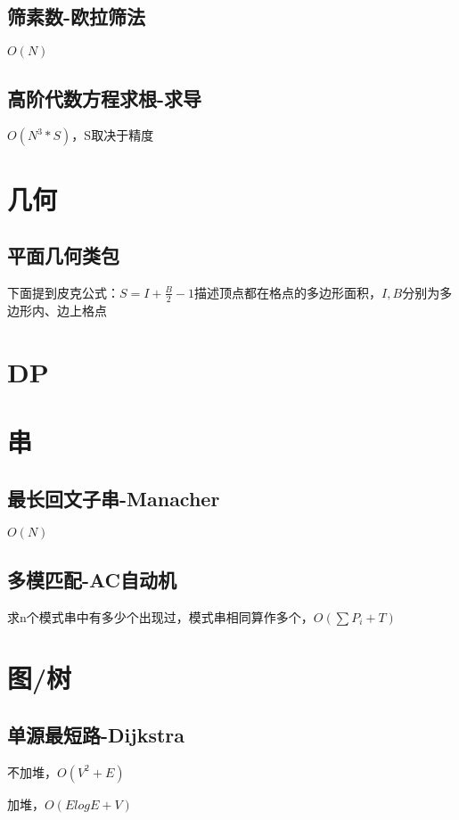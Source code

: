 \documentclass[10pt]{article}
\begin{document}
\subsection{筛素数-欧拉筛法}
$O(N)$


\subsection{高阶代数方程求根-求导}
$O(N^3*S)$，S取决于精度

\section{几何}
\subsection{平面几何类包}
下面提到皮克公式：$S=I+\frac{B}{2}-1$描述顶点都在格点的多边形面积，$I, B$分别为多边形内、边上格点

\section{DP}
\section{串}
\subsection{最长回文子串-Manacher}
$O(N)$

\subsection{多模匹配-AC自动机}
求n个模式串中有多少个出现过，模式串相同算作多个，$O(\sum P_i+T)$

\section{图/树}
\subsection{单源最短路-Dijkstra}
不加堆，$O(V^2+E)$

加堆，$O(ElogE+V)$

\end{document}
